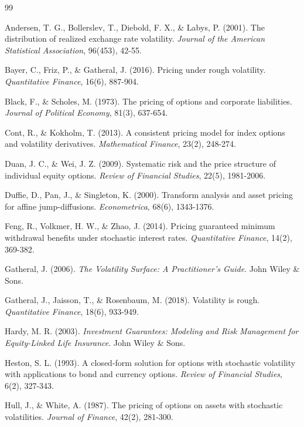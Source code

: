 \documentclass[12pt,a4paper]{report}
\begin{document}
\begin{thebibliography}{99}

 Andersen, T. G., Bollerslev, T., Diebold, F. X., \& Labys, P. (2001). The distribution of realized exchange rate volatility. \textit{Journal of the American Statistical Association}, 96(453), 42-55.

 Bayer, C., Friz, P., \& Gatheral, J. (2016). Pricing under rough volatility. \textit{Quantitative Finance}, 16(6), 887-904.

 Black, F., \& Scholes, M. (1973). The pricing of options and corporate liabilities. \textit{Journal of Political Economy}, 81(3), 637-654.

 Cont, R., \& Kokholm, T. (2013). A consistent pricing model for index options and volatility derivatives. \textit{Mathematical Finance}, 23(2), 248-274.

 Duan, J. C., \& Wei, J. Z. (2009). Systematic risk and the price structure of individual equity options. \textit{Review of Financial Studies}, 22(5), 1981-2006.

 Duffie, D., Pan, J., \& Singleton, K. (2000). Transform analysis and asset pricing for affine jump-diffusions. \textit{Econometrica}, 68(6), 1343-1376.

 Feng, R., Volkmer, H. W., \& Zhao, J. (2014). Pricing guaranteed minimum withdrawal benefits under stochastic interest rates. \textit{Quantitative Finance}, 14(2), 369-382.

 Gatheral, J. (2006). \textit{The Volatility Surface: A Practitioner's Guide}. John Wiley \& Sons.

 Gatheral, J., Jaisson, T., \& Rosenbaum, M. (2018). Volatility is rough. \textit{Quantitative Finance}, 18(6), 933-949.

 Hardy, M. R. (2003). \textit{Investment Guarantees: Modeling and Risk Management for Equity-Linked Life Insurance}. John Wiley \& Sons.

 Heston, S. L. (1993). A closed-form solution for options with stochastic volatility with applications to bond and currency options. \textit{Review of Financial Studies}, 6(2), 327-343.

 Hull, J., \& White, A. (1987). The pricing of options on assets with stochastic volatilities. \textit{Journal of Finance}, 42(2), 281-300.

\end{thebibliography}
\end{document}
